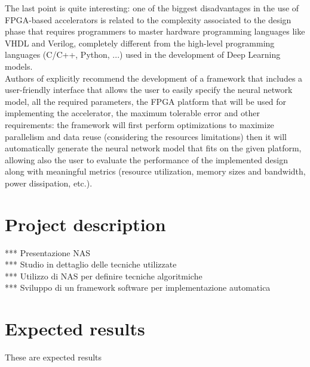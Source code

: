 \documentclass[11pt,a4paper]{article}
\begin{document}
The last point is quite interesting: one of the biggest disadvantages in the use of FPGA-based accelerators is related to the complexity associated to the design phase that requires programmers to master hardware programming languages like VHDL and Verilog, completely different from the high-level programming languages (C/C++, Python, ...) used in the development of Deep Learning models.\\
Authors of \cite{shawahna_review_2019} explicitly recommend the development of a framework that includes a user-friendly interface that allows the user to easily specify the neural network model, all the required parameters, the FPGA platform that will be used for implementing the accelerator, the maximum tolerable error and other requirements: the framework will first perform optimizations to maximize parallelism and data reuse (considering the resources limitations) then it will automatically generate the neural network model that fits on the given platform, allowing also the user to evaluate the performance of the implemented design along with meaningful metrics (resource utilization, memory sizes and bandwidth, power dissipation, etc.).

\section{Project description}
*** Presentazione NAS
\\*** Studio in dettaglio delle tecniche utilizzate
\\*** Utilizzo di NAS per definire tecniche algoritmiche
\\*** Sviluppo di un framework software per implementazione automatica

\section{Expected results}
These are expected results



\end{document}
